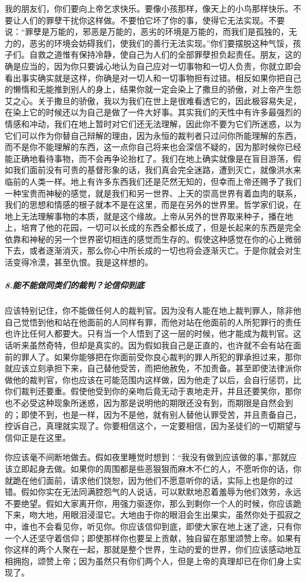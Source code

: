 \par 我的朋友们，你们要向上帝乞求快乐。要像小孩那样，像天上的小鸟那样快乐。不要让人们的罪孽干扰你这样做。不要怕它坏了你的事，使得它无法实现。不要说：“罪孽是万能的，邪恶是万能的，恶劣的环境是万能的，而我们是孤独的，无力的，恶劣的环境会妨碍我们，使我们的善行无法实现。”你们要摆脱这种气馁，孩子们。自救之道惟有保持冷静，使自己为人们的全部罪孽担负起责任。朋友，这的确是应当的，因为你只要诚心地认为自己应对一切事物和一切人负责，你就立即会看出事实确实就是这样，你确是对一切人和一切事物担有过错。相反如果你把自己的懒惰和无能推到别人的身上，结果你就一定会染上了撒旦的骄傲，对上帝产生怨艾之心。关于撒旦的骄傲，我以为我们在世上是很难看透它的，因此极容易失足，在染上它的时候还以为自己是做了一件大好事。其实我们的天性中有许多最强烈的情感和冲动，我们在地上暂时对它们还无法理解，因此你不要为它们所迷惑，以为它们可以作为你替自己辩解的理由，因为永恒的裁判者只过问你所能理解的东西，而不是你不能理解的东西，这一点你自己将来也会深信不疑的，因为那时候你已经能正确地看待事物，而不会再争论抬杠了。我们在地上确实就像是在盲目游荡，假如我们面前没有可贵的基督形象的话，我们真会完全迷路，遭到灭亡，就像洪水来临前的人类一样。地上有许多东西我们还是茫然无知的，但幸而上帝还赐予了我们一种宝贵而神秘的感觉，就是我们和另一世界、上天的崇高世界有着血肉的联系，我们的思想和情感的根子就本不是在这里，而是在另外的世界里。哲学家们说，在地上无法理解事物的本质，就是这个缘故。上帝从另外的世界取来种子，播在地上，培育了他的花园，一切可以长成的东西全都长成了，但是长起来的东西是完全依靠和神秘的另一个世界密切相连的感觉而生存的。假使这种感觉在你的心上微弱下去，或者逐渐消灭，那么你心中所长成的一切也将会逐渐灭亡。于是你就会对生活变得冷漠，甚至仇恨。我是这样想的。
\subparagraph*{8.能不能做同类们的裁判？论信仰到底}
\par 应该特别记住，你不能做任何人的裁判官。因为没有人能在地上裁判罪人，除非他自己觉悟到他和站在他面前的人同样有罪，而他对站在他面前的人所犯罪行的责任也许比任何人都要大。只有当一个人悟到了这一层的时候，他才能成为裁判官。这话听来虽然奇特，但却是真实的。因为假如我自己是正直的，也许就不会有站在面前的罪人了。如果你能够把在你面前受你良心裁判的罪人所犯的罪承担过来，那你就应该立刻承担下来，自己替他受苦，而把他赦免，不加责备。甚至即使法律派你做他的裁判官，你也应该在可能范围内这样做，因为他走了以后，会自行惩罚，比你们裁判还要重。假使他受到你的亲吻后竟无动于衷地走开，并且还要笑你，那你也不必受这种现象所迷惑，因为那是说明他的期限还没有到，而期限是自然会到的；即使不到，也是一样，因为不是他，就有别人替他认罪受苦，并且责备自己，控诉自己，真理就实现了。你要相信这个，一定要相信，因为圣徒们的一切期望与信仰正是在这里。
\par 你应该毫不间断地做去。假如夜里睡觉时想到：“我没有做到应该做的事，”那就应该立即起身去做。如果你的周围都是些恶狠狠而麻木不仁的人，不愿听你的话，你就跪在他们面前，请求他们饶恕，因为他们不愿意听你的话，实际上也是你的过错。假如你实在无法同满腔怨气的人说话，可以默默地忍着羞辱为他们效劳，永远不要绝望。假如大家离开你，用强力驱逐你，那么到剩你一个人的时候，你应该跪下来，吻大地，用眼泪浸湿它。大地由于你的眼泪会生出果实，虽然你处于孤寂之中，谁也不会看见你，听见你。你应该信仰到底，即使大家在地上迷了途，只有你一个人还坚守着信仰；即使那样你也要呈上贡献，独自留在那里颂赞上帝。如果有你这样的两个人聚在一起，那就是整个世界，生动的爱的世界，你们应该感动地互相拥抱，颂赞上帝；因为虽然只有你们两个人，但是上帝的真理却已在你们身上实现了。
